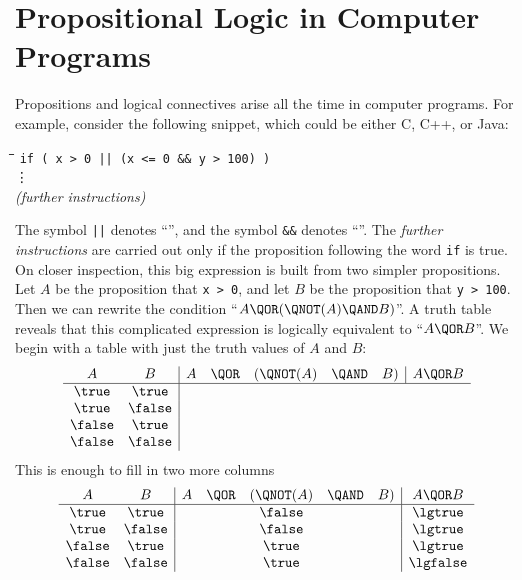 \begin{problems}
\practiceproblems
{}

\classproblems
{}

\homeworkproblems
{}
\end{problems}

\section{Propositional Logic in Computer Programs}

Propositions and logical connectives arise all the time in computer
programs.  For example, consider the following snippet, which could be
either C, C++, or Java:
%
\begin{tabbing}
\hspace{1in} \= \quad\quad \= \quad\quad \= \quad\quad \= \kill
\> \texttt{if ( x > 0 || (x <= 0 \&\& y > 100) )} \\
\> \> \vdots\\
\> \emph{(further instructions)}
\end{tabbing}
%
The symbol \texttt{||} denotes ``\QOR'', and the symbol \texttt{\&\&}
denotes ``\QAND''.  The \emph{further instructions} are carried out
only if the proposition following the word \texttt{if} is true.  On
closer inspection, this big expression is built from two simpler
propositions.  Let $A$ be the proposition that \texttt{x > 0}, and let
$B$ be the proposition that \texttt{y > 100}.  Then we can rewrite the
condition ``$A \QOR (\QNOT(A) \QAND B)$''.
%
A truth table reveals that this complicated expression is logically
equivalent to ``$A \QOR B$''.  We begin with a table with just the truth
values of $A$ and $B$:
\[
\begin{array}{cc|ccccc|c}
A      & B      & A  & \QOR  & (\QNOT(A)& \QAND & B) & A \QOR  B \\ \hline
\true  & \true \\
\true  & \false\\
\false & \true \\
\false & \false                       
\end{array}
\]
This is enough to fill in two more columns
\[
\begin{array}{cc|ccccc|c}
A      & B      & A & \QOR  & (\QNOT(A) & \QAND & B) & A \QOR  B \\ \hline
\true  & \true  &   &       &  \false   &       &    & \lgtrue \\
\true  & \false &   &       &  \false   &       &    & \lgtrue \\
\false & \true  &   &       &  \true    &       &    & \lgtrue \\
\false & \false &   &       &  \true    &       &    & \lgfalse\\
\end{array}
\]

